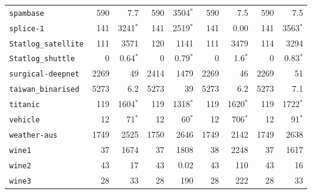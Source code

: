 \begin{tabular}{lrrrrrrrr}
\texttt{spambase} & 590 & 7.7 & 590 & 3504$^*$ & 590 & 7.5 & 590 & 7.5\\
\texttt{splice-1} & 141 & 3241$^*$ & 141 & 2519$^*$ & 141 & 0.00 & 141 & 3563$^*$\\
\texttt{Statlog\_satellite} & 111 & 3571 & 120 & 1141 & 111 & 3479 & 114 & 3294\\
\texttt{Statlog\_shuttle} & 0 & 0.64$^*$ & 0 & 0.79$^*$ & 0 & 1.6$^*$ & 0 & 0.83$^*$\\
\texttt{surgical-deepnet} & 2269 & 49 & 2414 & 1479 & 2269 & 46 & 2269 & 51\\
\texttt{taiwan\_binarised} & 5273 & 6.2 & 5273 & 39 & 5273 & 6.2 & 5273 & 7.1\\
\texttt{titanic} & 119 & 1604$^*$ & 119 & 1318$^*$ & 119 & 1620$^*$ & 119 & 1722$^*$\\
\texttt{vehicle} & 12 & 71$^*$ & 12 & 60$^*$ & 12 & 706$^*$ & 12 & 91$^*$\\
\texttt{weather-aus} & 1749 & 2525 & 1750 & 2646 & 1749 & 2142 & 1749 & 2638\\
\texttt{wine1} & 37 & 1674 & 37 & 1808 & 38 & 2248 & 37 & 1617\\
\texttt{wine2} & 43 & 17 & 43 & 0.02 & 43 & 110 & 43 & 16\\
\texttt{wine3} & 28 & 33 & 28 & 190 & 28 & 222 & 28 & 33\\
\bottomrule
\end{tabular}
